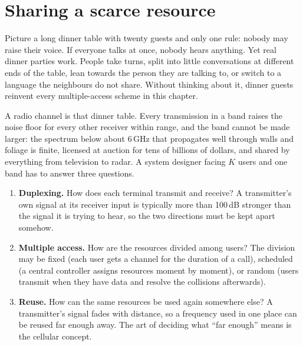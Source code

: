 
\section{Sharing a scarce resource}
\label{sec:ch20:sharing}

Picture a long dinner table with twenty guests and only one rule: nobody may raise their voice.
If everyone talks at once, nobody hears anything. Yet real dinner parties work. People take turns,
split into little conversations at different ends of the table, lean towards the person they are
talking to, or switch to a language the neighbours do not share. Without thinking about it,
dinner guests reinvent every multiple-access scheme in this chapter.

A radio channel is that dinner table. Every transmission in a band raises the noise floor for
every other receiver within range, and the band cannot be made larger: the spectrum below about
6\,GHz that propagates well through walls and foliage is finite, licensed at auction for tens of
billions of dollars, and shared by everything from television to radar. A system designer facing
$K$ users and one band has to answer three questions.
\begin{enumerate}
\item \textbf{Duplexing.} How does each terminal transmit and receive? A transmitter's own
signal at its receiver input is typically more than 100\,dB stronger than the signal it is
trying to hear, so the two directions must be kept apart somehow.
\item \textbf{Multiple access.} How are the resources divided among users? The division may
be fixed (each user gets a channel for the duration of a call), scheduled (a central
controller assigns resources moment by moment), or random (users transmit when they have
data and resolve the collisions afterwards).
\item \textbf{Reuse.} How can the same resources be used again somewhere else? A transmitter's
signal fades with distance, so a frequency used in one place can be reused far enough away.
The art of deciding what ``far enough'' means is the cellular concept.
\end{enumerate}

